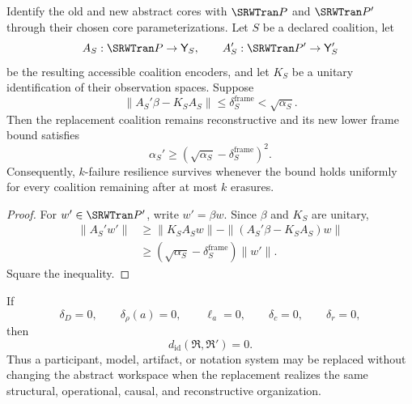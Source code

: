 \begin{SRWTcorollary}
\label{SRWT:cor:replacement-frame-bound}
Identify the old and new abstract cores with \(\SRWTran P\) and \(\SRWTran P'\)
through their chosen core parameterizations. Let \(S\) be a declared coalition,
let
\[
A_S:\SRWTran P\to\mathsf Y_S,
\qquad
A_S':\SRWTran P'\to\mathsf Y_S'
\]
be the resulting accessible coalition encoders, and let \(K_S\) be a unitary
identification of their observation spaces. Suppose
\[
\|A_S'\beta-K_SA_S\|
\leq
\delta_{S}^{\mathrm{frame}}
<
\sqrt{\alpha_S}.
\]
Then the replacement coalition remains reconstructive and its new lower frame
bound satisfies
\[
\boxed{
\alpha_S'
\geq
\left(
\sqrt{\alpha_S}-\delta_{S}^{\mathrm{frame}}
\right)^2.
}
\]
Consequently, \(k\)-failure resilience survives whenever the bound holds
uniformly for every coalition remaining after at most \(k\) erasures.
\end{SRWTcorollary}

\begin{proof}
For \(w'\in\SRWTran P'\), write \(w'=\beta w\). Since \(\beta\) and \(K_S\) are
unitary,
\[
\begin{aligned}
\|A_S'w'\|
&\geq
\|K_SA_Sw\|
-
\|(A_S'\beta-K_SA_S)w\|\\
&\geq
\left(
\sqrt{\alpha_S}-\delta_{S}^{\mathrm{frame}}
\right)\|w'\|.
\end{aligned}
\]
Square the inequality.
\end{proof}

\begin{SRWTcorollary}\label{SRWT:cor:exact-carrier-replacement}
If
\[
\delta_D=0,
\qquad
\delta_\rho(a)=0,
\qquad
\ell_a=0,
\qquad
\delta_c=0,
\qquad
\delta_r=0,
\]
then
\[
d_{\mathrm{id}}(\mathfrak R,\mathfrak R')=0.
\]
Thus a participant, model, artifact, or notation system may be replaced without
changing the abstract workspace when the replacement realizes the same
structural, operational, causal, and reconstructive organization.
\end{SRWTcorollary}


